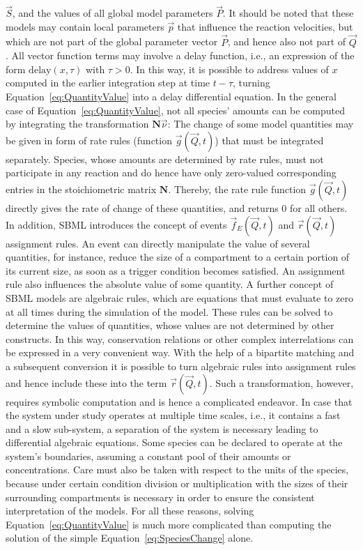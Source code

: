 \documentclass[10pt]{bmc_article}
\newenvironment{bmcformat}{\baselineskip20pt\sloppy\setboolean{publ}{false}}{\baselineskip20pt\sloppy}
\begin{document}
\begin{bmcformat}
$\vec{S}$, and the values of all global model parameters $\vec{P}$.
It should be noted that these models may contain local parameters $\vec{p}$ that
influence the reaction velocities, but which are not part of the global parameter
vector $\vec{P}$, and hence also not part of $\vec{Q}$. All vector function terms
may involve a delay function, i.e., an expression of the form $\mathrm{delay}(x, \tau)$
with $\tau > 0$. In this way, it is possible to address values of $x$ computed in
the earlier integration step at time $t - \tau$, turning Equation~\ref{eq:QuantityValue}
into a delay differential equation.
In the general case of Equation~\ref{eq:QuantityValue}, not all species' amounts
can be computed by integrating the transformation $\mathbf{N}\vec{\nu}$: The
change of some model quantities may be given in form of rate rules (function
$\vec{g}(\vec{Q}, t)$) that must be integrated separately.
Species, whose amounts are determined by rate rules, must not participate in any
reaction and do hence have only zero-valued corresponding entries in the
stoichiometric matrix $\mathbf{N}$.
Thereby, the rate rule function $\vec{g}(\vec{Q}, t)$ directly gives the rate of
change of these quantities, and returns 0 for all others.
In addition, SBML introduces the concept of events $\vec{f}_E(\vec{Q}, t)$ and
$\vec{r}(\vec{Q}, t)$ assignment rules.
An event can directly manipulate the value of several quantities, for instance,
reduce the size of a compartment to a certain portion of its current size,
as soon as a trigger condition becomes satisfied.
An assignment rule also influences the absolute value of some quantity.
A further concept of SBML models are algebraic rules, which are equations that
must evaluate to zero at all times during the simulation of the model.
These rules can be solved to determine the values of quantities, whose values
are not determined by other constructs.
In this way, conservation relations or other complex interrelations can be
expressed in a very convenient way.
With the help of a bipartite matching and a subsequent conversion it is possible
to turn algebraic rules into assignment rules and hence include these into the
term $\vec{r}(\vec{Q}, t)$.
Such a transformation, however, requires symbolic computation and is
hence a complicated endeavor.
In case that the system under study operates at multiple time scales, i.e., it
contains a fast and a slow sub-system, a separation of the system is necessary
leading to differential algebraic equations.
Some species can be declared to operate at the system's boundaries, assuming a
constant pool of their amounts or concentrations.
Care must also be taken with respect to the units of the species, because under
certain condition division or multiplication with the sizes of their surrounding
compartments is necessary in order to ensure the consistent interpretation of
the models. 
For all these reasons, solving Equation~\ref{eq:QuantityValue} is much more 
complicated than computing the solution of the simple Equation~\ref{eq:SpeciesChange}
alone.


\end{bmcformat}
\end{document}

